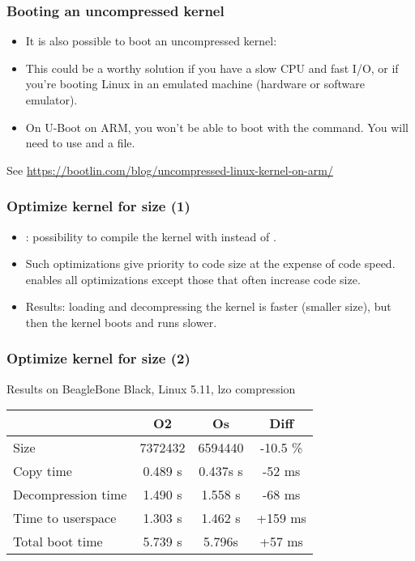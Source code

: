 \begin{frame}
\frametitle{Booting an uncompressed kernel}
\begin{itemize}
    \item It is also possible to boot an uncompressed kernel:\\
    \item This could be a worthy solution if you have a slow CPU
	  and fast I/O, or if you're booting Linux in an emulated
	  machine (hardware or software emulator).
    \item On U-Boot on ARM, you won't be able to boot with the
	   command. You will need to use 
	  and a  file.
\end{itemize}
See \url{https://bootlin.com/blog/uncompressed-linux-kernel-on-arm/}
\end{frame}

\begin{frame}
\frametitle{Optimize kernel for size (1)}
\begin{itemize}
\item {}: possibility to compile the kernel
      with  instead of .
\item Such optimizations give priority to code size at the expense of code speed.
       enables all  optimizations except those that
      often increase code size.
\item Results: loading and decompressing the kernel is faster (smaller
      size), but then the kernel boots and runs slower.
\end{itemize}
\end{frame}

\begin{frame}
\frametitle{Optimize kernel for size (2)}
Results on BeagleBone Black, Linux 5.11, lzo compression
\begin{tabular}{| l || c | c | c |}
\hline
& O2 & Os & Diff \\
\hline
Size & 7372432 & 6594440 & -10.5 \% \\
Copy time &  0.489 s & 0.437s s & -52 ms \\
Decompression time & 1.490 s & 1.558 s & -68 ms \\
Time to userspace & 1.303 s & 1.462 s & +159 ms \\
Total boot time & 5.739 s & 5.796s & +57 ms \\
\hline
\end{tabular}
\newline\newline
\end{frame}

